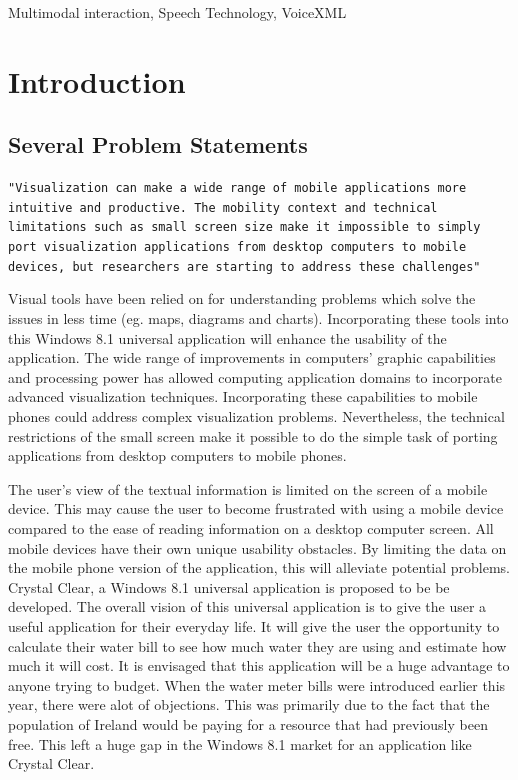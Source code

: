 \documentclass[runningheads,a4paper]{llncs}
\begin{document}
\keywords 
Multimodal interaction, Speech Technology, VoiceXML
\section{Introduction}
\subsection{Several Problem Statements}
\begin{inparaenum}[]
{\texttt{"Visualization can make a wide range of mobile applications more intuitive and productive. The mobility context and technical limitations such as small screen size make it impossible to simply port visualization applications from desktop computers to mobile devices, but researchers are starting to address these challenges"\cite {seraj2012study}}} 
\end{inparaenum}

\begin{inparaenum}[]
Visual tools have been relied on for understanding problems which solve the issues in less time (eg. maps, diagrams and charts). Incorporating these tools into this Windows 8.1 universal application will enhance the usability of the application. The wide range of improvements in computers' graphic capabilities and processing power has allowed computing application domains to incorporate advanced visualization techniques. Incorporating these capabilities to mobile phones could address complex visualization problems. Nevertheless, the technical restrictions of the small screen make it possible to do the simple task of porting applications from desktop computers to mobile phones.
\end{inparaenum}

\begin{inparaenum}[]
The user's view of the textual information is limited on the screen of a mobile device. This may cause the user to become frustrated with using a mobile device compared to the ease of reading information on a desktop computer screen. All mobile devices have their own unique usability obstacles. By limiting the data on the mobile phone version of the application, this will alleviate potential problems. Crystal Clear, a Windows 8.1 universal application is proposed to be be developed. The overall vision of this universal application is to give the user a useful application for their everyday life. It will give the user the opportunity to calculate their water bill to see how much water they are using and estimate how much it will cost. It is envisaged that this application will be a huge advantage to anyone trying to budget. When the water meter bills were introduced earlier this year, there were alot of objections. This was primarily due to the fact that the population of Ireland would be paying for a resource that had previously been free. This left a huge gap in the Windows 8.1 market for an application like Crystal Clear.
\end{inparaenum}
\end{document}
